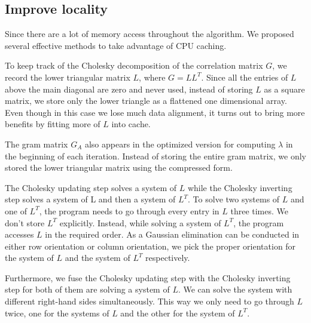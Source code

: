 \subsection{Improve locality}
Since there are a lot of memory access throughout the algorithm.
We proposed several effective methods to take advantage of CPU caching.

To keep track of the Cholesky decomposition of the correlation matrix $G$, we record the lower triangular matrix $L$, where $G = LL^T$. Since all the entries of $L$ above the main diagonal are zero and never used, instead of storing $L$ as a square matrix, we store only the lower triangle as a flattened one dimensional array. Even though in this case we lose much data alignment, it turns out to bring more benefits by fitting more of $L$ into cache.

The gram matrix $G_A$ also appears in the optimized version for computing $\lambda$ in the beginning of each iteration. Instead of storing the entire gram matrix, we only stored the lower triangular matrix using the compressed form.

The Cholesky updating step solves a system of $L$ while the Cholesky inverting step solves a system of L and then a system of $L^T$. To solve two systems of $L$ and one of $L^T$, the program needs to go through every entry in $L$ three times. We don't store $L^T$ explicitly. Instead, while solving a system of $L^T$, the program accesses $L$ in the required order. As a Gaussian elimination can be conducted in either row orientation or column orientation, we pick the proper orientation for the system of $L$ and the system of $L^T$ respectively. 

Furthermore, we fuse the Cholesky updating step with the Cholesky inverting step for both of them are solving a system of $L$. We can solve the system with different right-hand sides simultaneously. This way we only need to go through $L$ twice, one for the systems of $L$ and the other for the system of $L^T$.

